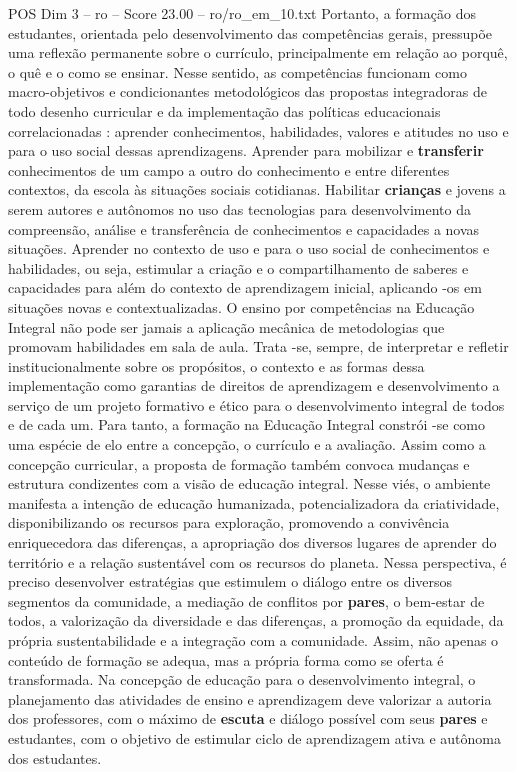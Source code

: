 \begin{textsample}{POS Dim 3 – ro – Score 23.00 – ro/ro\_em\_10.txt}
Portanto, a formação dos estudantes, orientada pelo desenvolvimento das competências gerais, pressupõe uma reflexão permanente sobre o currículo, principalmente em relação ao porquê, o quê e o como se ensinar.
Nesse sentido, as competências funcionam como macro-objetivos e condicionantes metodológicos das propostas integradoras de todo desenho curricular e da implementação das políticas educacionais correlacionadas : aprender conhecimentos, habilidades, valores e atitudes no uso e para o uso social dessas aprendizagens.
Aprender para mobilizar e \textbf{transferir} conhecimentos de um campo a outro do conhecimento e entre diferentes contextos, da escola às situações sociais cotidianas.
Habilitar \textbf{crianças} e jovens a serem autores e autônomos no uso das tecnologias para desenvolvimento da compreensão, análise e transferência de conhecimentos e capacidades a novas situações.
Aprender no contexto de uso e para o uso social de conhecimentos e habilidades, ou seja, estimular a criação e o compartilhamento de saberes e capacidades para além do contexto de aprendizagem inicial, aplicando -os em situações novas e contextualizadas.
O ensino por competências na Educação Integral não pode ser jamais a aplicação mecânica de metodologias que promovam habilidades em sala de aula.
Trata -se, sempre, de interpretar e refletir institucionalmente sobre os propósitos, o contexto e as formas dessa implementação como garantias de direitos de aprendizagem e desenvolvimento a serviço de um projeto formativo e ético para o desenvolvimento integral de todos e de cada um.
Para tanto, a formação na Educação Integral constrói -se como uma espécie de elo entre a concepção, o currículo e a avaliação.
Assim como a concepção curricular, a proposta de formação também convoca mudanças e estrutura condizentes com a visão de educação integral.
Nesse viés, o ambiente manifesta a intenção de educação humanizada, potencializadora da criatividade, disponibilizando os recursos para exploração, promovendo a convivência enriquecedora das diferenças, a apropriação dos diversos lugares de aprender do território e a relação sustentável com os recursos do planeta.
Nessa perspectiva, é preciso desenvolver estratégias que estimulem o diálogo entre os diversos segmentos da comunidade, a mediação de conflitos por \textbf{pares}, o bem-estar de todos, a valorização da diversidade e das diferenças, a promoção da equidade, da própria sustentabilidade e a integração com a comunidade.
Assim, não apenas o conteúdo de formação se adequa, mas a própria forma como se oferta é transformada.
Na concepção de educação para o desenvolvimento integral, o planejamento das atividades de ensino e aprendizagem deve valorizar a autoria dos professores, com o máximo de \textbf{escuta} e diálogo possível com seus \textbf{pares} e estudantes, com o objetivo de estimular ciclo de aprendizagem ativa e autônoma dos estudantes.

\end{textsample}
